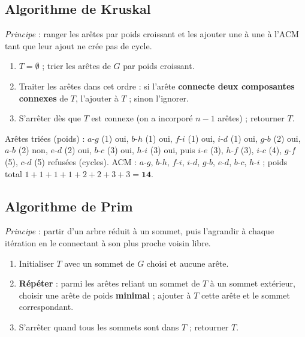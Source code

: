 \documentclass[11pt,a4paper]{article}
\begin{document}
\subsection{Algorithme de Kruskal}
\begin{algo}[Kruskal]
\emph{Principe} : ranger les arêtes par poids croissant et les ajouter une à une à l'ACM tant que leur ajout ne crée pas de cycle.
\begin{enumerate}[nosep]
\item $T=\emptyset$ ; trier les arêtes de $G$ par poids croissant.
\item Traiter les arêtes dans cet ordre : si l'arête \textbf{connecte deux composantes connexes} de $T$, l'ajouter à $T$ ; sinon l'ignorer.
\item S'arrêter dès que $T$ est connexe (on a incorporé $n-1$ arêtes) ; retourner $T$.
\end{enumerate}
\end{algo}

\begin{exemple}
Arêtes triées (poids) : $a$-$g$ (1) oui, $b$-$h$ (1) oui, $f$-$i$ (1) oui, $i$-$d$ (1) oui, $g$-$b$ (2) oui, $a$-$b$ (2) non, $e$-$d$ (2) oui, $b$-$c$ (3) oui, $h$-$i$ (3) oui, puis $i$-$e$ (3), $h$-$f$ (3), $i$-$c$ (4), $g$-$f$ (5), $c$-$d$ (5) refusées (cycles).
ACM : $a$-$g$, $b$-$h$, $f$-$i$, $i$-$d$, $g$-$b$, $e$-$d$, $b$-$c$, $h$-$i$ ; poids total $1+1+1+1+2+2+3+3=\mathbf{14}$.
\end{exemple}

\subsection{Algorithme de Prim}
\begin{algo}[Prim]
\emph{Principe} : partir d'un arbre réduit à un sommet, puis l'agrandir à chaque itération en le connectant à son plus proche voisin libre.
\begin{enumerate}[nosep]
\item Initialiser $T$ avec un sommet de $G$ choisi et aucune arête.
\item \textbf{Répéter} : parmi les arêtes reliant un sommet de $T$ à un sommet extérieur, choisir une arête de poids \textbf{minimal} ; ajouter à $T$ cette arête et le sommet correspondant.
\item S'arrêter quand tous les sommets sont dans $T$ ; retourner $T$.
\end{enumerate}
\end{algo}
\end{document}
